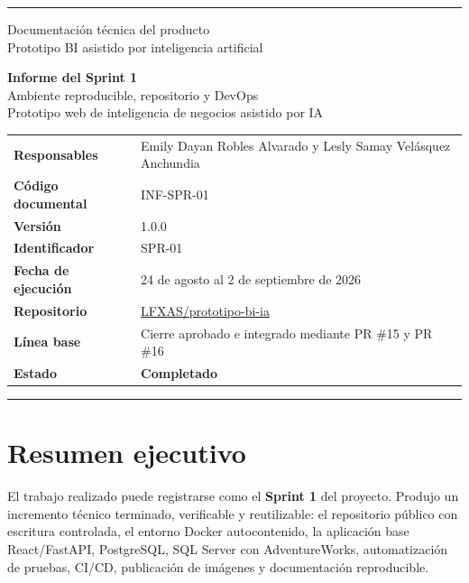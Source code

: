 \documentclass[11pt,letterpaper]{article}
\newcommand{\statusok}{\textcolor{deepgreen}{\textbf{Completado}}}
\begin{document}
\hypersetup{pageanchor=false}

\begin{titlepage}
  \thispagestyle{empty}
  \vspace*{0.8cm}
  {\color{ugblue}\rule{\textwidth}{2.8pt}}
  \vspace{1.2cm}

  {\Large Documentación técnica del producto\\[0.25em]
  Prototipo BI asistido por inteligencia artificial}

  \vfill

  {\color{deepgreen}\fontsize{30}{35}\selectfont\textbf{Informe del Sprint 1}}\\[0.7em]
  {\LARGE Ambiente reproducible, repositorio y DevOps}\\[0.6em]
  {\large Prototipo web de inteligencia de negocios asistido por IA}

  \vspace{1.5cm}

  \begin{tabularx}{\textwidth}{@{}>{\bfseries}l X@{}}
    Responsables & Emily Dayan Robles Alvarado y Lesly Samay Velásquez Anchundia \\
    Código documental & INF-SPR-01 \\
    Versión & 1.0.0 \\
    Identificador & SPR-01 \\
    Fecha de ejecución & 24 de agosto al 2 de septiembre de 2026 \\
    Repositorio & \href{https://github.com/LFXAS/prototipo-bi-ia}{LFXAS/prototipo-bi-ia} \\
    Línea base & Cierre aprobado e integrado mediante PR \#15 y PR \#16 \\
    Estado & \statusok \\
  \end{tabularx}

  \vfill
  {\color{ugblue}\rule{\textwidth}{2.8pt}}
\end{titlepage}

\hypersetup{pageanchor=true}
\tableofcontents
\newpage
{}

\section{Resumen ejecutivo}

El trabajo realizado puede registrarse como el \textbf{Sprint 1} del proyecto. Produjo un incremento técnico terminado, verificable y reutilizable: el repositorio público con escritura controlada, el entorno Docker autocontenido, la aplicación base React/FastAPI, PostgreSQL, SQL Server con AdventureWorks, automatización de pruebas, CI/CD, publicación de imágenes y documentación reproducible.
\end{document}
